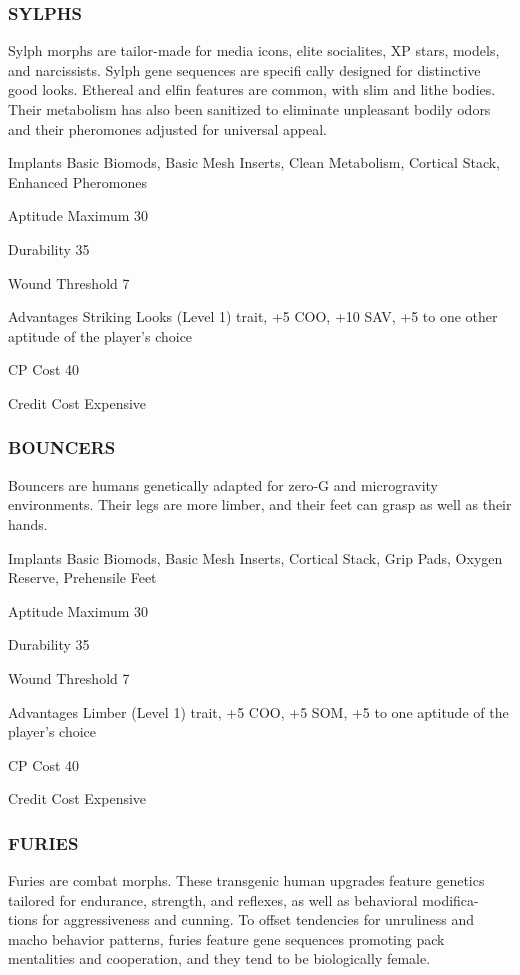 \subsubsection{SYLPHS}
Sylph morphs are tailor-made for media icons, elite socialites, XP stars,
models, and narcissists. Sylph gene sequences are specifi cally designed for
distinctive good looks. Ethereal and elfin features are common, with slim and
lithe bodies. Their metabolism has also been sanitized to eliminate
unpleasant bodily odors and their pheromones adjusted for universal appeal.

\begin{description*}
\item[Implants] Basic Biomods, Basic Mesh Inserts, Clean Metabolism, Cortical
  Stack, Enhanced Pheromones
\item[Aptitude Maximum] 30 
\item[Durability] 35 
\item[Wound Threshold] 7 
\item[Advantages] Striking Looks (Level 1) trait, +5 COO, +10 SAV, +5 to one
  other aptitude of the player’s choice
\item[CP Cost] 40 
\item[Credit Cost] Expensive 
\end{description*}

\subsubsection{BOUNCERS}
Bouncers are humans genetically adapted for zero-G and microgravity
environments. Their legs are more limber, and their feet can grasp as well as
their hands.

\begin{description*}
\item[Implants] Basic Biomods, Basic Mesh Inserts, Cortical Stack, Grip Pads,
  Oxygen Reserve, Prehensile Feet
\item[Aptitude Maximum] 30 
\item[Durability] 35 
\item[Wound Threshold] 7 
\item[Advantages] Limber (Level 1) trait, +5 COO, +5 SOM, +5 to one aptitude of
  the player’s choice
\item[CP Cost] 40 
\item[Credit Cost] Expensive 
\end{description*}

\subsubsection{FURIES}
Furies are combat morphs. These transgenic human upgrades feature genetics
tailored for endurance, strength, and reflexes, as well as behavioral modifica-
tions for aggressiveness and cunning. To offset tendencies for unruliness and
macho behavior patterns, furies feature gene sequences promoting pack
mentalities and cooperation, and they tend to be biologically female.

